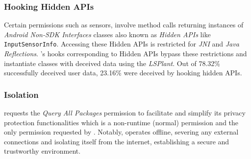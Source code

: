 \subsubsection{Hooking Hidden APIs} Certain permissions such as sensors, involve method calls returning instances of \textit{Android Non-SDK Interfaces} classes also known as \textit{Hidden APIs} like \texttt{InputSensorInfo}. Accessing these Hidden APIs is restricted for \textit{JNI} and \textit{Java Reflections}. \framework{}'s hooks corresponding to Hidden APIs bypass these restrictions and instantiate classes with deceived data using the \textit{LSPlant}. Out of 78.32\% successfully deceived user data, 23.16\% were deceived by hooking hidden APIs.

\subsubsection{Isolation} \framework{} requests the \textit{Query All Packages} permission to facilitate and simplify its privacy protection functionalities which is a non-runtime (normal) permission and the only permission requested by \framework{}. Notably, \framework{} operates offline, severing any external connections and isolating itself from the internet, establishing a secure and trustworthy environment.
